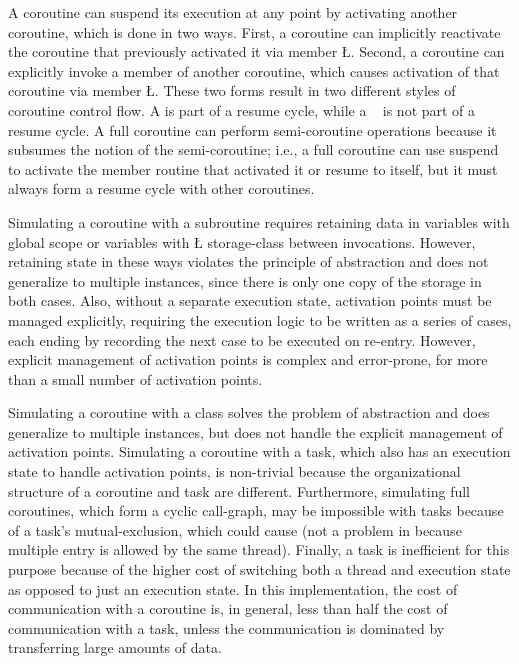 \documentclass[openright,twoside]{report}
\begin{document}
A coroutine can suspend its execution at any point by activating another coroutine, which is done in two ways.
First, a coroutine can implicitly reactivate the coroutine that previously activated it via member \LGinlinetrue\LGbegin\lgrinde\L{}\endlgrinde\LGend{}.
Second, a coroutine can explicitly invoke a member of another coroutine, which causes activation of that coroutine via member \LGinlinetrue\LGbegin\lgrinde\L{}\endlgrinde\LGend{}.
These two forms result in two different styles of coroutine control flow.
A  is part of a resume cycle, while a ~\cite[p.~4, 37]{Marlin80} is not part of a resume cycle.
A full coroutine can perform semi-coroutine operations because it subsumes the notion of the semi-coroutine;
i.e., a full coroutine can use suspend to activate the member routine that activated it or resume to itself, but it must always form a resume cycle with other coroutines.

\begin{annotation}
Simulating a coroutine with a subroutine requires retaining data in variables with global scope or variables with \LGinlinetrue\LGbegin\lgrinde\L{}\endlgrinde\LGend{} storage-class between invocations.
However, retaining state in these ways violates the principle of abstraction and does not generalize to multiple instances, since there is only one copy of the storage in both cases.
Also, without a separate execution state, activation points must be managed explicitly, requiring the execution logic to be written as a series of cases, each ending by recording the next case to be executed on re-entry.
However, explicit management of activation points is complex and error-prone, for more than a small number of activation points.

Simulating a coroutine with a class solves the problem of abstraction and does generalize to multiple instances, but does not handle the explicit management of activation points.
Simulating a coroutine with a task, which also has an execution state to handle activation points, is non-trivial because the organizational structure of a coroutine and task are different.
Furthermore, simulating full coroutines, which form a cyclic call-graph, may be impossible with tasks because of a task's mutual-exclusion, which could cause  (not a problem in \uC because multiple entry is allowed by the same thread).
Finally, a task is inefficient for this purpose because of the higher cost of switching both a thread and execution state as opposed to just an execution state.
In this implementation, the cost of communication with a coroutine is, in general, less than half the cost of communication with a task, unless the communication is dominated by transferring large amounts of data.
\end{annotation}
\end{document}
